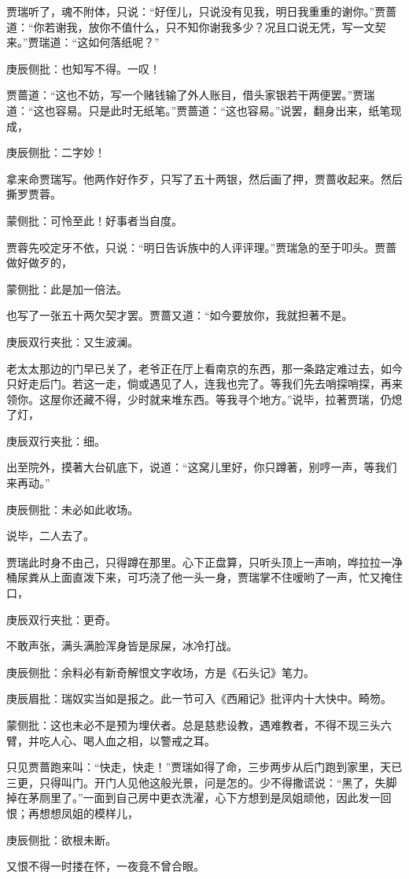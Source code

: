 \begin{parag}
    贾瑞听了，魂不附体，只说：“好侄儿，只说没有见我，明日我重重的谢你。”贾蔷道：“你若谢我，放你不值什么，只不知你谢我多少？况且口说无凭，写一文契来。”贾瑞道：“这如何落纸呢？”\begin{note}庚辰侧批：也知写不得。一叹！\end{note}贾蔷道：“这也不妨，写一个赌钱输了外人账目，借头家银若干两便罢。”贾瑞道：“这也容易。只是此时无纸笔。”贾蔷道：“这也容易。”说罢，翻身出来，纸笔现成，\begin{note}庚辰侧批：二字妙！\end{note}拿来命贾瑞写。他两作好作歹，只写了五十两银，然后画了押，贾蔷收起来。然后撕罗贾蓉。\begin{note}蒙侧批：可怜至此！好事者当自度。\end{note}贾蓉先咬定牙不依，只说：“明日告诉族中的人评评理。”贾瑞急的至于叩头。贾蔷做好做歹的，\begin{note}蒙侧批：此是加一倍法。\end{note}也写了一张五十两欠契才罢。贾蔷又道：“如今要放你，我就担著不是。\begin{note}庚辰双行夹批：又生波澜。\end{note}老太太那边的门早已关了，老爷正在厅上看南京的东西，那一条路定难过去，如今只好走后门。若这一走，倘或遇见了人，连我也完了。等我们先去哨探哨探，再来领你。这屋你还藏不得，少时就来堆东西。等我寻个地方。”说毕，拉著贾瑞，仍熄了灯，\begin{note}庚辰双行夹批：细。\end{note}出至院外，摸著大台矶底下，说道：“这窝儿里好，你只蹲著，别哼一声，等我们来再动。”\begin{note}庚辰侧批：未必如此收场。\end{note}说毕，二人去了。
\end{parag}


\begin{parag}
    贾瑞此时身不由己，只得蹲在那里。心下正盘算，只听头顶上一声响，哗拉拉一净桶尿粪从上面直泼下来，可巧浇了他一头一身，贾瑞掌不住嗳哟了一声，忙又掩住口，\begin{note}庚辰双行夹批：更奇。\end{note}不敢声张，满头满脸浑身皆是尿屎，冰冷打战。\begin{note}庚辰侧批：余料必有新奇解恨文字收场，方是《石头记》笔力。\end{note}\begin{note}庚辰眉批：瑞奴实当如是报之。此一节可入《西厢记》批评内十大快中。畸笏。\end{note}\begin{note}蒙侧批：这也未必不是预为埋伏者。总是慈悲设教，遇难教者，不得不现三头六臂，并吃人心、喝人血之相，以警戒之耳。\end{note}只见贾蔷跑来叫：“快走，快走！”贾瑞如得了命，三步两步从后门跑到家里，天已三更，只得叫门。开门人见他这般光景，问是怎的。少不得撒谎说：“黑了，失脚掉在茅厕里了。”一面到自己房中更衣洗濯，心下方想到是凤姐顽他，因此发一回恨；再想想凤姐的模样儿，\begin{note}庚辰侧批：欲根未断。\end{note}又恨不得一时搂在怀，一夜竟不曾合眼。
\end{parag}


